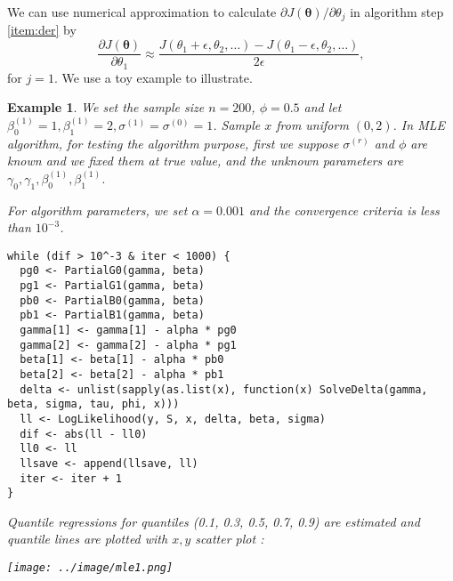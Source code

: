 \documentclass[12pt]{article}
\newtheorem{emp}[thm]{Example}
\begin{document}
We can use numerical approximation to calculate $\partial J(\bm \theta)/\partial \theta_j$ in
algorithm step \ref{item:der} by
\begin{displaymath}
  \frac{\partial J(\bm \theta)}{\partial \theta_1} \approx \frac{J(\theta_1 + \epsilon, \theta_2, \ldots) - J(\theta_1 - \epsilon, \theta_2 , \ldots)}{2\epsilon}, 
\end{displaymath}
for $j = 1$. We use a toy example to illustrate.
\begin{emp}
  We set the sample size $n = 200$, $\phi = 0.5$ and let $\beta_0^{(1)} = 1,
  \beta_1^{(1)}= 2, \sigma^{(1)} = \sigma^{(0)} = 1$. Sample $x$ from
  uniform $(0, 2)$. In MLE algorithm, for testing the algorithm
  purpose, first we suppose $\sigma^{(r)}$ and $\phi$ are known and we
  fixed them at true value, and the unknown parameters are $\gamma_0,\gamma_1,
  \beta_0^{(1)} , \beta_1^{(1)}$.

  For algorithm parameters, we set $\alpha = 0.001$ and the convergence
  criteria is less than $10^{-3}$.
\begin{verbatim}
while (dif > 10^-3 & iter < 1000) {
  pg0 <- PartialG0(gamma, beta)
  pg1 <- PartialG1(gamma, beta)
  pb0 <- PartialB0(gamma, beta)
  pb1 <- PartialB1(gamma, beta)
  gamma[1] <- gamma[1] - alpha * pg0
  gamma[2] <- gamma[2] - alpha * pg1
  beta[1] <- beta[1] - alpha * pb0
  beta[2] <- beta[2] - alpha * pb1
  delta <- unlist(sapply(as.list(x), function(x) SolveDelta(gamma, beta, sigma, tau, phi, x)))
  ll <- LogLikelihood(y, S, x, delta, beta, sigma)
  dif <- abs(ll - ll0)
  ll0 <- ll
  llsave <- append(llsave, ll)
  iter <- iter + 1
}
\end{verbatim}

  Quantile regressions for quantiles (0.1, 0.3, 0.5, 0.7, 0.9) are
  estimated and quantile lines are plotted with $x, y$ scatter plot :

  \texttt{[image: ../image/mle1.png]}
\end{emp}
\end{document}
